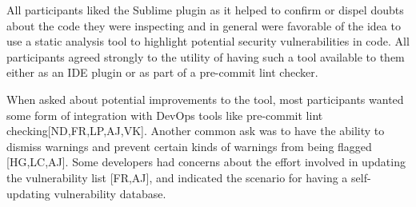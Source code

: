 All participants liked the Sublime plugin as it helped to confirm or dispel doubts about the code they were inspecting and in general were favorable of the idea to use a static analysis tool to highlight potential security vulnerabilities in code. All participants agreed strongly to the utility of having such a tool available to them either as an IDE plugin or as part of a pre-commit lint checker. 

When asked about potential improvements to the tool, most participants wanted some form of integration with DevOps tools like pre-commit lint checking[ND,FR,LP,AJ,VK]. Another common ask was to have the ability to dismiss warnings and prevent certain kinds of warnings from being flagged [HG,LC,AJ]. Some developers had concerns about the effort involved in updating the vulnerability list [FR,AJ], and indicated the scenario for having a self-updating vulnerability database.



